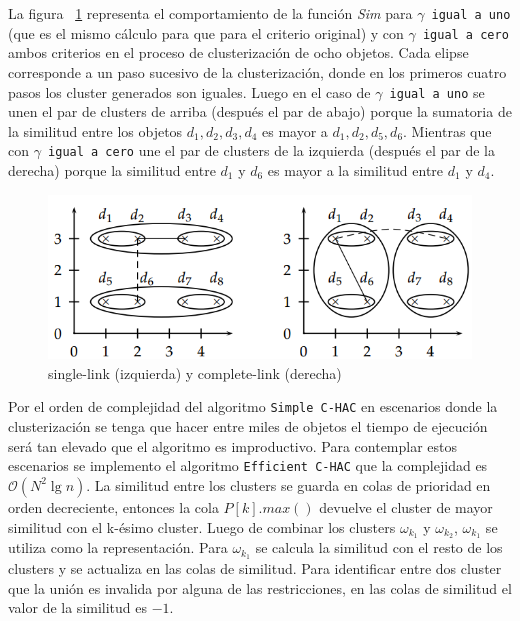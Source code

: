 La figura ~\ref{des:LinkageCriteria} representa el comportamiento de la función \textit{Sim} para \texttt{$\gamma$ igual a uno} (que es el mismo cálculo para que para el criterio original) y con \texttt{$\gamma$ igual a cero} ambos criterios en el proceso de clusterización de ocho objetos. Cada elipse corresponde a un paso sucesivo de la clusterización, donde en los primeros cuatro pasos los cluster generados son iguales. Luego en el caso de \texttt{$\gamma$ igual a uno} se unen el par de clusters de arriba (después el par de abajo) porque la sumatoria de la similitud entre los objetos $d_1,d_2,d_3,d_4$ es mayor a $d_1,d_2,d_5,d_6$. Mientras que con \texttt{$\gamma$ igual a cero} une el par de clusters de la izquierda (después el par de la derecha) porque la similitud entre $d_1$ y $d_6$ es mayor a la similitud entre $d_1$ y $d_4$.\\

\begin{figure}[H]
  \centering
    \includegraphics[width=1\textwidth]{img/LinkageCriteria.png}
  \caption{single-link (izquierda) y complete-link (derecha)}
  \label{des:LinkageCriteria}
\end{figure}


Por el orden de complejidad del algoritmo \texttt{Simple C-HAC}  en escenarios donde la clusterización se tenga que hacer entre miles de objetos el tiempo de ejecución será tan elevado que el algoritmo es improductivo. Para contemplar estos escenarios se implemento el algoritmo \texttt{Efficient C-HAC} que la complejidad es $\mathcal{O}(N^{2}\lg n)$. La similitud entre los clusters se guarda en colas de prioridad en orden decreciente, entonces la cola $P\left[k\right].max()$ devuelve el cluster de mayor similitud con el k-ésimo cluster. Luego de combinar los clusters $\omega_{k_{1}}$ y $\omega_{k_{2}}$, $\omega_{k_{1}}$ se utiliza como la representación. Para $\omega_{k_{1}}$ se calcula la similitud con el resto de los clusters y se actualiza en las colas de similitud. Para identificar entre dos cluster que la unión es invalida por alguna de las restricciones, en las colas de similitud el valor de la similitud es $-1$.\\

